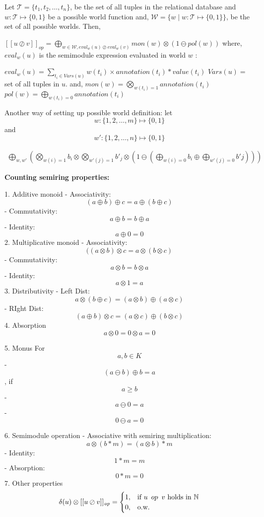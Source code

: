 \documentclass[twocolumn]{article}
\begin{document}
Let $\mathcal{T} = \{t_1, t_2, \dots, t_n\}$, be the set of all tuples in the relational database and $w: \mathcal{T} \mapsto \{0,1\}$ be a possible world function and,
$\mathcal{W} = \{w \mid w:\mathcal{T} \mapsto \{0,1\}\}$, be the set of all possible worlds.
Then,

$[[u \oslash v]]_{op}= \bigoplus_{w \in \mathcal{W},{eval_w(u) \oslash eval_w(v)}} mon(w)\otimes\left(1 \ominus pol(w)\right)$
where,
$eval_w(u)$ is the semimodule expression evaluated in world $w$ :

$eval_{w}(u) = \sum_{t_i\in Vars(u)} w(t_i)\times annotation(t_i)*value(t_i)$
$Vars(u) =$ set of all tuples in $u$.
and,
$ mon(w)=\bigotimes_{w(t_i)=1}annotation(t_i)$\\
$pol(w)=\bigoplus_{w(t_i)=0}annotation(t_i)$



Another way of setting up possible world definition:\newline
let $$w: \{1,2,\dots,m\} \mapsto \{0,1\}$$ and $$w': \{1,2,\dots,n\} \mapsto \{0,1\}$$

\begin{multline}
  \bigoplus_{w,w'}\left(\bigotimes_{w(i)=1}b_i\otimes\bigotimes_{w'(j) = 1}b'_j\otimes\left(1\ominus(\bigoplus_{w(i) =0}b_i\oplus \bigoplus_{w'(j) = 0}b'j)\right)\right)
\end{multline}

\textbf{Counting semiring properties:}

1. Additive monoid
- Associativity: $$(a \oplus b) \oplus c = a \oplus (b\oplus c)$$
- Commutativity: $$a \oplus b = b \oplus a$$
- Identity: $$a \oplus 0 = 0$$
2. Multiplicative monoid
- Associativity: $$( (a \otimes b) \otimes c = a \otimes (b\otimes c)$$
- Commutativity: $$a \otimes b = b \otimes a$$
- Identity: $$a \otimes 1 = a$$
3. Distributivity
- Left Dist: $$a \otimes (b \oplus c)= (a \otimes b)\oplus(a \otimes c)$$
- RIght Dist: $$(a \oplus b)\otimes c=(a \otimes c)\oplus(b \otimes c)$$
 4. Absorption
$$a \otimes 0 = 0 \otimes a = 0$$

5. Monus \newline
For $$a, b \in K$$
- $$(a \ominus b) \oplus b =a$$, if $$a \geq b$$
- $$a \ominus 0 =a$$
- $$0 \ominus a = 0$$

6. Semimodule operation
- Associative with semiring multiplication: $$a \otimes (b * m)= (a \otimes b) * m$$
- Identity: $$1*m=m$$
- Absorption: $$0*m=0$$
7. Other properties
$$
 \delta(u)\otimes[[u \oslash   v]]_{\mathit{op}}=\begin{cases}1, & \text{if } u\hspace{0.5em} op\hspace{0.5em} v \text{ holds in } \mathbb{N} \\
0,&\text{o.w.}\end{cases}
$$
\end{document}
